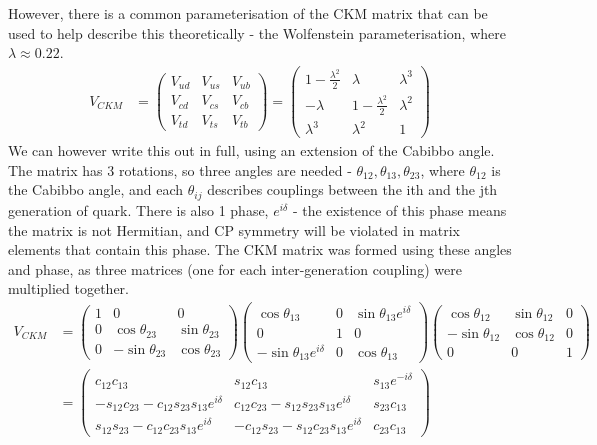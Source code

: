 \documentclass[a4paper, 11pt, normalem]{article}
\begin{document}
However, there is a common parameterisation of the CKM matrix that can be used to help describe this theoretically - the Wolfenstein parameterisation, where $\lambda\approx0.22$.
\begin{align}
    V_{CKM} &= \begin{pmatrix} V_{ud} & V_{us} & V_{ub} \\ V_{cd} & V_{cs} & V_{cb} \\ V_{td} & V_{ts} & V_{tb}\end{pmatrix} = \begin{pmatrix} 1-\frac{\lambda^2}{2} & \lambda & \lambda^3 \\ -\lambda & 1-\frac{\lambda^2}{2} & \lambda^2 \\ \lambda^3 & \lambda^2 & 1\end{pmatrix}
\end{align}
We can however write this out in full, using an extension of the Cabibbo angle.
The matrix has 3 rotations, so three angles are needed - $\theta_{12},\theta_{13},\theta_{23}$, where $\theta_{12}$ is the Cabibbo angle, and each $\theta_{ij}$ describes couplings between the ith and the jth generation of quark. 
There is also 1 phase, $e^{i\delta}$ - the existence of this phase means the matrix is not Hermitian, and CP symmetry will be violated in matrix elements that contain this phase. 
The CKM matrix was formed using these angles and phase, as three matrices (one for each inter-generation coupling) were multiplied together.
\begin{align}
    V_{CKM} &= \begin{pmatrix} 1 & 0 & 0 \\ 0 & \cos\theta_{23} & \sin\theta_{23} \\ 0 & -\sin\theta_{23} & \cos\theta_{23} \end{pmatrix}\begin{pmatrix} \cos\theta_{13} & 0 & \sin\theta_{13}e^{i\delta} \\ 0 & 1 & 0 \\ -\sin\theta_{13}e^{i\delta} & 0 & \cos\theta_{13}\end{pmatrix}\begin{pmatrix}\cos\theta_{12} & \sin\theta_{12} & 0 \\ -\sin\theta_{12} & \cos\theta_{12} & 0 \\ 0 & 0 & 1 \end{pmatrix}\\
            &= \begin{pmatrix} c_{12}c_{13} & s_{12}c_{13} & s_{13}e^{-i\delta} \\ -s_{12}c_{23}-c_{12}s_{23}s_{13}e^{i\delta} & c_{12}c_{23} - s_{12}s_{23}s_{13}e^{i\delta} & s_{23}c_{13} \\ s_{12}s_{23}-c_{12}c_{23}s_{13}e^{i\delta} & -c_{12}s_{23}-s_{12}c_{23}s_{13}e^{i\delta} & c_{23}c_{13}\end{pmatrix}
\end{align}
\end{document}
